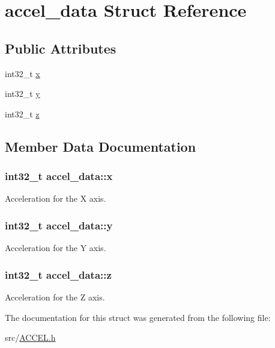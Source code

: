 \hypertarget{structaccel__data}{\section{accel\-\_\-data Struct Reference}
\label{structaccel__data}
}
\subsection*{Public Attributes}
\begin{DoxyCompactItemize}
\item 
int32\-\_\-t \hyperlink{structaccel__data_ab8eaba7b94ca9075ea181ebb4d65acd6}{x}
\item 
int32\-\_\-t \hyperlink{structaccel__data_a54beeafc17cee97b728cf328cc80e877}{y}
\item 
int32\-\_\-t \hyperlink{structaccel__data_ac1e23737b7bc84f7d19b9efc3d083b9d}{z}
\end{DoxyCompactItemize}


\subsection{Member Data Documentation}
\hypertarget{structaccel__data_ab8eaba7b94ca9075ea181ebb4d65acd6}{
\subsubsection[{x}]{\setlength{\rightskip}{0pt plus 5cm}int32\-\_\-t accel\-\_\-data\-::x}}\label{structaccel__data_ab8eaba7b94ca9075ea181ebb4d65acd6}
Acceleration for the X axis. \hypertarget{structaccel__data_a54beeafc17cee97b728cf328cc80e877}{
\subsubsection[{y}]{\setlength{\rightskip}{0pt plus 5cm}int32\-\_\-t accel\-\_\-data\-::y}}\label{structaccel__data_a54beeafc17cee97b728cf328cc80e877}
Acceleration for the Y axis. \hypertarget{structaccel__data_ac1e23737b7bc84f7d19b9efc3d083b9d}{
\subsubsection[{z}]{\setlength{\rightskip}{0pt plus 5cm}int32\-\_\-t accel\-\_\-data\-::z}}\label{structaccel__data_ac1e23737b7bc84f7d19b9efc3d083b9d}
Acceleration for the Z axis. 

The documentation for this struct was generated from the following file\-:\begin{DoxyCompactItemize}
\item 
src/\hyperlink{_a_c_c_e_l_8h}{A\-C\-C\-E\-L.\-h}\end{DoxyCompactItemize}
